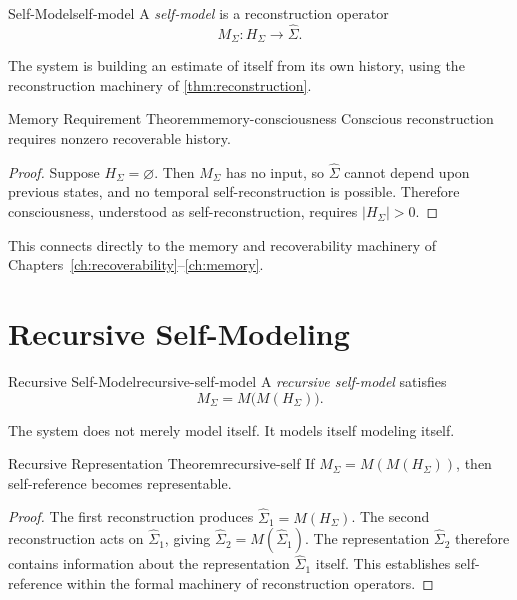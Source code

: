 \documentclass[12pt,twoside,openright]{book}
\begin{document}
\begin{definition}{Self-Model}{self-model}
  A \emph{self-model} is a reconstruction operator
  \[
    M_\Sigma : H_\Sigma \to \hat{\Sigma}.
  \]
\end{definition}

The system is building an estimate of itself from its own
history, using the reconstruction machinery of
\cref{thm:reconstruction}.

\begin{theorem}{Memory Requirement Theorem}{memory-consciousness}
  Conscious reconstruction requires nonzero recoverable
  history.
\end{theorem}

\begin{proof}
  Suppose $H_\Sigma = \varnothing$. Then $M_\Sigma$ has no
  input, so $\hat{\Sigma}$ cannot depend upon previous
  states, and no temporal self-reconstruction is possible.
  Therefore consciousness, understood as self-reconstruction,
  requires $|H_\Sigma| > 0$.
\end{proof}

This connects directly to the memory and recoverability
machinery of Chapters~\ref{ch:recoverability}--\ref{ch:memory}.

\section{Recursive Self-Modeling}
\label{sec:ch21-recursive}

\begin{definition}{Recursive Self-Model}{recursive-self-model}
  A \emph{recursive self-model} satisfies
  \[
    M_\Sigma = M\bigl(M(H_\Sigma)\bigr).
  \]
\end{definition}

The system does not merely model itself. It models itself
modeling itself.

\begin{theorem}{Recursive Representation Theorem}{recursive-self}
  If $M_\Sigma = M(M(H_\Sigma))$, then self-reference
  becomes representable.
\end{theorem}

\begin{proof}
  The first reconstruction produces $\hat{\Sigma}_1 = M(H_\Sigma)$.
  The second reconstruction acts on $\hat{\Sigma}_1$, giving
  $\hat{\Sigma}_2 = M(\hat{\Sigma}_1)$. The representation
  $\hat{\Sigma}_2$ therefore contains information about the
  representation $\hat{\Sigma}_1$ itself. This establishes
  self-reference within the formal machinery of
  reconstruction operators.
\end{proof}
\end{document}
